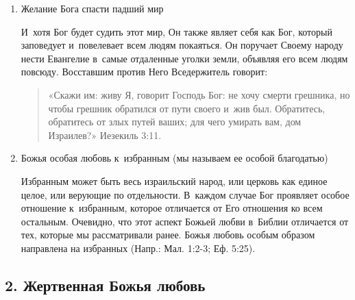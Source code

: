 \documentclass[a4paper,12pt]{article}
\begin{document}
\begin{enumerate}
    \item Желание Бога спасти падший мир
        
    И~хотя Бог будет судить этот мир, Он также являет себя как Бог, который заповедует и~повелевает всем людям покаяться. Он поручает Своему народу нести Евангелие в~самые отдаленные уголки земли, объявляя его всем людям повсюду. Восставшим против Него Вседержитель говорит: 
    
    \begin{quote}
    «Скажи им: живу Я, говорит Господь Бог: не хочу смерти грешника, но чтобы грешник обратился от пути своего и~жив был. Обратитесь, обратитесь от злых путей ваших; для чего умирать вам, дом Израилев?» Иезекиль 3:11.
    \end{quote} 

    \item Божья особая любовь к~избранным (мы называем ее особой благодатью)

    Избранным может быть весь израильский народ, или церковь как единое целое, или верующие по отдельности. В~каждом случае Бог проявляет особое отношение к~избранным, которое отличается от Его отношения ко всем остальным. Очевидно, что этот аспект Божьей любви в~Библии отличается от тех, которые мы рассматривали ранее. Божья любовь особым образом направлена на избранных (Напр.: Мал. 1:2-3; Еф. 5:25).

\end{enumerate}

\subsection{2. Жертвенная Божья любовь}
\end{document}
